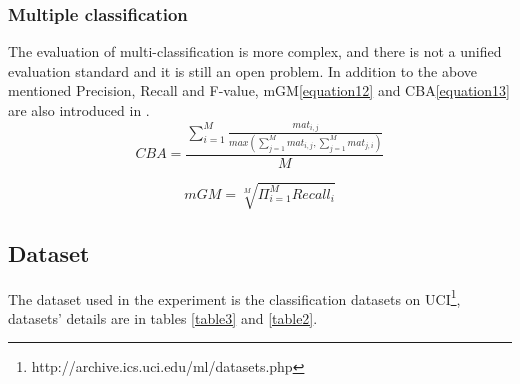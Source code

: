 \documentclass[runningheads]{llncs}
\begin{document}
\subsubsection{Multiple classification}
The evaluation of multi-classification is more complex,
 and there is not a unified evaluation standard and it is still an open problem.
 In addition to the above mentioned Precision, Recall and F-value,
 mGM\ref{equation12} and CBA\ref{equation13} are also introduced in \cite{2017Relevance}.
 \begin{equation}
  \label{equation12}
  CBA=\frac{\sum_{i=1}^{M}\frac{mat_{i,j}}{max(\sum_{j=1}^Mmat_{i,j},\sum_{j=1}^M mat_{j,i})}}{M}
\end{equation}

\begin{equation}
  \label{equation13}
  mGM=\sqrt[M]{\Pi_{i=1}^M Recall_{i}}
\end{equation}

\subsection{Dataset}
The dataset used in the experiment is the classification 
datasets on UCI\footnote{http://archive.ics.uci.edu/ml/datasets.php},
datasets' details are in tables \ref{table3} and \ref{table2}.
\end{document}
